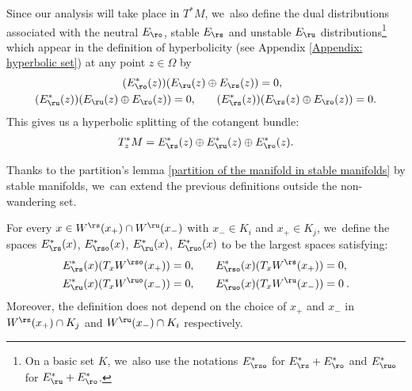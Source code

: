 Since our analysis will take place in $T^* M$, we~also define the dual distributions associated with the neutral $E_\ro$, stable $E_\rs$ and unstable $E_\ru$ distributions\footnote{On a basic set $K$, we~also use the notations $E_{\rso}^*$ for $E_\rs^* + E_\ro^*$ and $E_{\ruo}^*$ for $E_\ru^* + E_\ro^*$.} which appear in the definition of hyperbolicity (see Appendix \ref{Appendix: hyperbolic set}) at any point $z \in \Omega$ by
\begin{align*}
(E_\ro^*(z))(E_\ru(z) &\oplus E_\rs(z)) = 0, \\
(E_\ru^*(z))(E_\ru(z) \oplus E_\ro(z)) = 0, \quad & \quad (E_\rs^*(z))(E_\rs(z) \oplus E_\ro(z)) = 0.
\end{align*}
This gives us a hyperbolic splitting of the cotangent bundle:
\begin{align*}
T_z^* M = E_\rs^* (z) \oplus E_\ru^* (z) \oplus E_\ro^*(z).
\end{align*}


Thanks to the partition's lemma \ref{partition of the manifold in stable manifolds} by stable manifolds, we~can extend the previous definitions outside the non-wandering set.

\begin{definition}\label{def distributions duales stables et instables sur Omega}
For every $x \in W^\rs (x_+) \cap W^\ru (x_{-})$ with $x_- \in K_i$ and $x_+ \in K_j$, we~define the spaces $E_\rs^*(x)$, $E_\rso^* (x)$, $E_\ru^*(x)$, $E_{\ruo}^* (x)$ to be the largest spaces satisfying:
\begin{align*}
E_\rs^*(x) (T_x W^{\rso} (x_+)) = 0, &\qquad E_\rso^* (x)(T_x W^{\rs} (x_+)) = 0,\\
E_\ru^*(x) (T_x W^{\ruo} (x_-)) = 0, &\qquad E_{\ruo}^* (x)(T_x W^{\ru} (x_-)) = 0 \:.
\end{align*}
Moreover, the definition does not depend on the choice of $x_+$ and $x_-$ in $W^\rs (x_+) \cap K_j$ and $W^\ru (x_-) \cap K_i$ respectively.
\end{definition}

